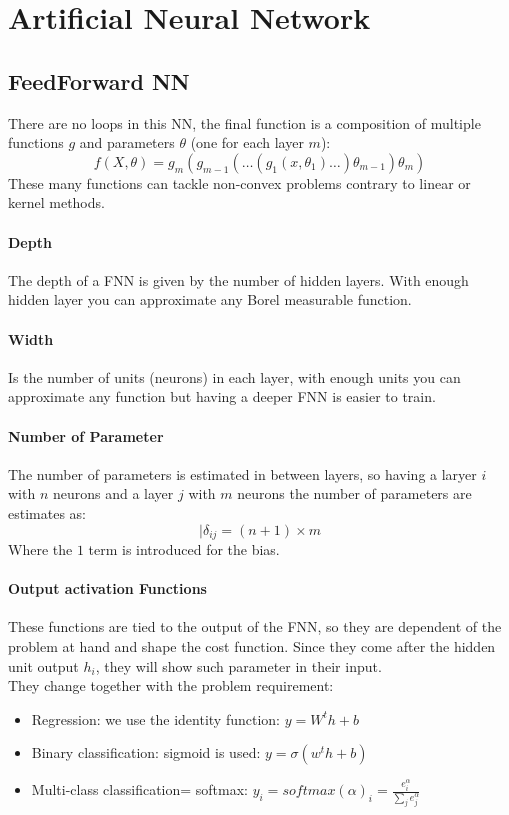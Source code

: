\section{Artificial Neural Network}

\subsection{FeedForward NN}

There are no loops in this NN, the final function is a composition of multiple functions $g$ and parameters $\theta$ (one for each layer $m$):
$$f(X,\theta)=g_m(g_{m-1}(\dots(g_1(x,\theta_1)\dots)\theta_{m-1})\theta_m)$$
These many functions can tackle non-convex problems contrary to linear or kernel methods.\\

\paragraph{Depth}
The depth of a FNN is given by the number of hidden layers. With enough hidden layer you can  approximate any Borel measurable function.

\paragraph{Width}
Is the number of units (neurons) in each layer, with enough units you can approximate any function but having a deeper FNN is easier to train.

\paragraph{Number of Parameter}
The number of parameters is estimated in between layers, so having a laryer $i$ with $n$ neurons and a layer $j$ with $m$ neurons the number of parameters are estimates as:
$$ |\delta_{ij} = (n + 1) × m$$
Where the $1$ term is introduced for the bias.

\paragraph{Output activation Functions}
These functions are tied to the output of the FNN, so they are dependent of the problem at hand and shape the cost function. Since they come after the hidden unit output $h_i$, they will show such parameter in their input.\\
They change together with the problem requirement:
\begin{itemize}
\item Regression: we use the identity function: $y=W^th+b$
\item Binary classification: sigmoid is used: $y=\sigma(w^th+b)$
\item  Multi-class classification= softmax: $y_i=softmax(\alpha)_i=\frac{e^\alpha_i}{\sum_j e^\alpha_j}$
\end{itemize}



